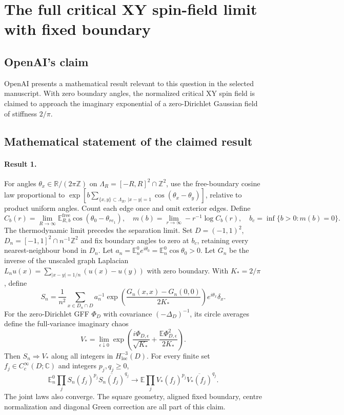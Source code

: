 \documentclass[11pt]{article}
\begin{document}
\section*{The full critical XY spin-field limit with fixed boundary}

\subsection{OpenAI's claim}
OpenAI presents a mathematical result relevant to this question in the selected manuscript. With zero boundary angles, the normalized critical XY spin field is claimed to approach the imaginary exponential of a zero-Dirichlet Gaussian field of stiffness $2/\pi$.

\subsection{Mathematical statement of the claimed result}
\paragraph{Result 1.} For angles $\theta_x\in\mathbb R/(2\pi\mathbb Z)$ on $\Lambda_R=[-R,R]^2\cap\mathbb Z^2$, use the free-boundary cosine law proportional to $\exp[b\sum_{\{x,y\}\subset\Lambda_R,\,|x-y|=1}\cos(\theta_x-\theta_y)]$, relative to product uniform angles. Count each edge once and omit exterior edges. Define
\[
 C_b(r)=\lim_{R\to\infty}\mathbb E_{R,b}^{\mathrm{free}}\cos(\theta_0-\theta_{re_1}),\quad
 m(b)=\lim_{r\to\infty}-r^{-1}\log C_b(r),\quad b_c=\inf\{b>0:m(b)=0\}.
\]
The thermodynamic limit precedes the separation limit. Set $D=(-1,1)^2$, $D_n=[-1,1]^2\cap n^{-1}\mathbb Z^2$ and fix boundary angles to zero at $b_c$, retaining every nearest-neighbour bond in $D_n$. Let $a_n=\mathbb E_n^0e^{i\theta_0}=\mathbb E_n^0\cos\theta_0>0$. Let $G_n$ be the inverse of the unscaled graph Laplacian $L_nu(x)=\sum_{|x-y|=1/n}(u(x)-u(y))$ with zero boundary. With $K_*=2/\pi$, define
\[
 S_n=\frac1{n^2}\sum_{x\in D_n\cap D}a_n^{-1}
 \exp\left(\frac{G_n(x,x)-G_n(0,0)}{2K_*}\right)e^{i\theta_x}\delta_x.
\]
For the zero-Dirichlet GFF $\Phi_D$ with covariance $(-\Delta_D)^{-1}$, its circle averages define the full-variance imaginary chaos
\[
 V_*=\lim_{\epsilon\downarrow0}\exp\left(\frac{i\Phi_{D,\epsilon}}{\sqrt{K_*}}
 +\frac{\mathbb E\Phi_{D,\epsilon}^2}{2K_*}\right).
\]
Then $S_n\Longrightarrow V_*$ along all integers in $H^{-3}_{\mathrm{loc}}(D)$. For every finite set $f_j\in C_c^\infty(D;\mathbb C)$ and integers $p_j,q_j\ge0$,
\[
 \mathbb E_n^0\prod_jS_n(f_j)^{p_j}\overline{S_n(f_j)}^{q_j}
 \longrightarrow\mathbb E\prod_jV_*(f_j)^{p_j}\overline{V_*(f_j)}^{q_j}.
\]
The joint laws also converge. The square geometry, aligned fixed boundary, centre normalization and diagonal Green correction are all part of this claim.
\end{document}
